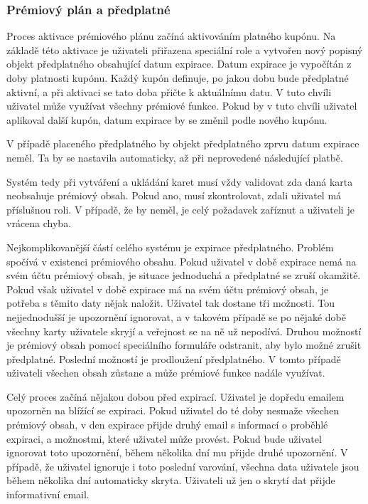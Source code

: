		\subsubsection{Prémiový plán a předplatné}

		Proces aktivace prémiového plánu začíná aktivováním platného kupónu.
		Na základě této aktivace je uživateli přiřazena speciální role a vytvořen nový popisný objekt předplatného
		obsahující datum expirace.
		Datum expirace je vypočítán z doby platnosti kupónu.
		Každý kupón definuje, po jakou dobu bude předplatné aktivní, a při aktivaci se tato doba přičte k aktuálnímu datu.
		V tuto chvíli uživatel může využívat všechny prémiové funkce.
		Pokud by v tuto chvíli uživatel aplikoval další kupón, datum expirace by se změnil podle nového kupónu.

		V případě placeného předplatného by objekt předplatného zprvu datum expirace neměl.
		Ta by se nastavila automaticky, až při neprovedené následující platbě.

		Systém tedy při vytváření a ukládání karet musí vždy validovat zda daná karta neobsahuje prémiový obsah.
		Pokud ano, musí zkontrolovat, zdali uživatel má příslušnou roli.
		V případě, že by neměl, je celý požadavek zaříznut a uživateli je vrácena chyba.

		Nejkomplikovanější částí celého systému je expirace předplatného.
		Problém spočívá v existenci prémiového obsahu.
		Pokud uživatel v době expirace nemá na svém účtu prémiový obsah, je situace jednoduchá a předplatné se zruší okamžitě.
		Pokud však uživatel v době expirace má na svém účtu prémiový obsah, je potřeba s těmito daty nějak naložit.
		Uživatel tak dostane tři možnosti.
		Tou nejjednodušší je upozornění ignorovat, a v takovém případě se po nějaké době všechny karty uživatele skryjí
		a veřejnost se na ně už nepodívá.
		Druhou možností je prémiový obsah pomocí speciálního formuláře odstranit, aby bylo možné zrušit předplatné.
		Poslední možností je prodloužení předplatného.
		V tomto případě uživateli všechen obsah zůstane a může prémiové funkce nadále využívat.

		Celý proces začíná nějakou dobou před expirací.
		Uživatel je dopředu emailem upozorněn na blížící se expiraci.
		Pokud uživatel do té doby nesmaže všechen prémiový obsah, v den expirace přijde druhý email s informací o
		proběhlé expiraci, a možnostmi, které uživatel může provést.
		Pokud bude uživatel ignorovat toto upozornění, během několika dní mu přijde druhé upozornění.
		V případě, že uživatel ignoruje i toto poslední varování, všechna data uživatele jsou během několika dní
		automaticky skryta.
		Uživateli už jen o skrytí dat přijde informativní email.

